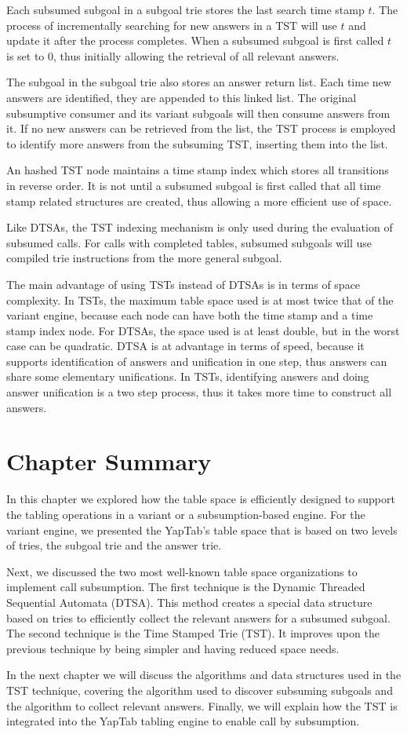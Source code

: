 Each subsumed subgoal in a subgoal trie stores the last search time stamp $t$. The process of
incrementally searching for new answers in a TST will use $t$ and update it after the process completes.
When a subsumed subgoal is first called $t$ is set to $0$, thus initially allowing the retrieval of all
relevant answers.

The subgoal in the subgoal trie also stores an answer return list. Each time new answers are identified, they are appended
to this linked list. The original subsumptive consumer and its variant subgoals will then consume answers from it. If no
new answers can be retrieved from the list, the TST process is employed to identify more answers from the subsuming TST,
inserting them into the list.

An hashed TST node maintains a time stamp index which stores all transitions in reverse order.
It is not until a subsumed subgoal is first called that all time stamp related structures are created, thus
allowing a more efficient use of space.

Like DTSAs, the TST indexing mechanism is only used during the evaluation of subsumed calls.
For calls with completed tables, subsumed subgoals will use compiled trie instructions from the more general subgoal.

The main advantage of using TSTs instead of DTSAs is in terms of space complexity. In TSTs, the maximum table space
used is at most twice that of the variant engine, because each node can have both the time stamp and a time stamp index node.
For DTSAs, the space used is at least double, but in the worst
case can be quadratic. DTSA is at advantage in terms of speed, because it supports identification of answers and
unification in one step, thus answers can share some elementary unifications. In TSTs, identifying answers
and doing answer unification is a two step process, thus it takes more time to construct all answers. 

\section{Chapter Summary}

In this chapter we explored how the table space is efficiently designed to support
the tabling operations in a variant or a subsumption-based engine.
For the variant engine, we presented the YapTab's table space that is based on two levels
of tries, the subgoal trie and the answer trie.

Next, we discussed the two most well-known table space organizations to implement call subsumption.
The first technique is the Dynamic Threaded Sequential Automata (DTSA). This method creates a special data
structure based on tries to efficiently collect the relevant answers for a subsumed subgoal.
The second technique is the Time Stamped Trie (TST). It improves upon the previous technique by
being simpler and having reduced space needs.

In the next chapter we will discuss the algorithms and data structures used in the TST technique,
covering the algorithm used to discover subsuming subgoals and the algorithm to collect relevant
answers. Finally, we will explain how the TST is integrated into the YapTab tabling engine to enable
call by subsumption.
